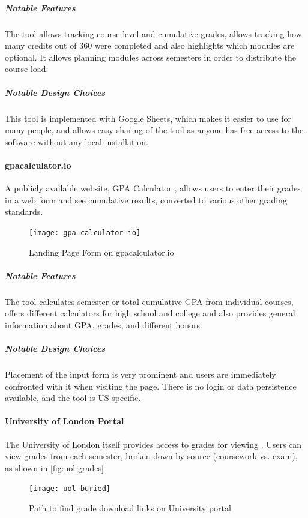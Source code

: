 \subparagraph{Notable Features}
The tool allows tracking course-level and cumulative grades, allows tracking how many credits out of 360 were completed and also highlights which modules are optional. It allows planning modules across semesters in order to distribute the course load.

\subparagraph{Notable Design Choices}
This tool is implemented with Google Sheets, which makes it easier to use for many people, and allows easy sharing of the tool as anyone has free access to the software without any local installation.

\paragraph{gpacalculator.io}

A publicly available website, GPA Calculator \cite{gpa_calculator}, allows users to enter their grades in a web form and see cumulative results, converted to various other grading standards.

\begin{figure}[H] 
\noindent \texttt{[image: gpa-calculator-io]}
\centering
\caption{Landing Page Form on gpacalculator.io}
\label{fig:gpa-calc}
\end{figure}
\medskip

\subparagraph{Notable Features}
The tool calculates semester or total cumulative GPA from individual courses, offers different calculators for high school and college and also provides general information about GPA, grades, and different honors.

\subparagraph{Notable Design Choices}
Placement of the input form is very prominent and users are immediately confronted with it when visiting the page. There is no login or data persistence available, and the tool is US-specific.

\paragraph{University of London Portal}

The University of London itself provides access to grades for viewing \cite{uol}. Users can view grades from each semester, broken down by source (coursework vs. exam), as shown in \autoref{fig:uol-grades}

\begin{figure}[H]
\noindent \texttt{[image: uol-buried]}
\centering
\caption{Path to find grade download links on University portal}
\label{fig:uol-grades}
\end{figure}

